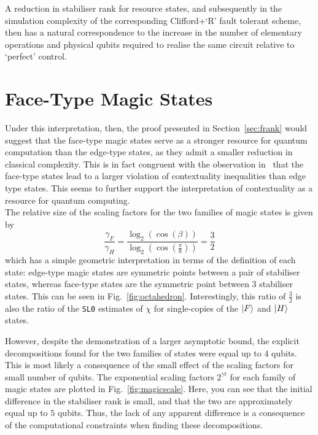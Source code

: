 \documentclass{standalone}
\begin{document}
A reduction in stabiliser rank for resource states, and subsequently in the simulation complexity of the corresponding Clifford+`R' fault tolerant scheme, then has a natural correspondence to the increase in the number of elementary operations and physical qubits required to realise the same circuit relative to `perfect' control. 
\par
\section{Face-Type Magic States}
Under this interpretation, then, the proof presented in Section~\ref{sec:frank} would suggest that the face-type magic states serve as a stronger resource for quantum computation than the edge-type states, as they admit a smaller reduction in classical complexity. This is in fact congruent with the observation in~\cite{Howard2014} that the face-type states lead to a larger violation of contextuality inequalities than edge type states. This seems to further support the interpretation of contextuality as a resource for quantum computing. \\
The relative size of the scaling factors for the two families of magic states is given by
\begin{equation}
    \frac{\gamma_{F}}{\gamma_{H}} = \frac{\log_{2}\left(\cos(\beta)\right)}{\log_{2}\left(\cos(\frac{\pi}{8})\right)} = \frac{3}{2}
\end{equation}
which has a simple geometric interpretation in terms of the definition of each state: edge-type magic states are symmetric points between a pair of stabiliser states, whereas face-type states are the symmetric point between 3 stabiliser states. This can be seen in Fig.~\ref{fig:octahedron}. 
Interestingly, this ratio of $\frac{3}{2}$ is also the ratio of the \texttt{SL0} estimates of $\chi$ for single-copies of the $\ket{F}$ and $\ket{H}$ states. 
\par
However, despite the demonstration of a larger asymptotic bound, the explicit decompositions found for the two families of states were equal up to $4$ qubits. This is most likely a consequence of the small effect of the scaling factors for small number of qubits. The exponential scaling factors $2^{\gamma t}$ for each family of magic states are plotted in Fig.~\ref{fig:magicscale}. Here, you can see that the initial difference in the stabiliser rank is small, and that the two are approximately equal up to $5$ qubits. Thus, the lack of any apparent difference is a consequence of the computational constraints when finding these decompositions. 
\end{document}
